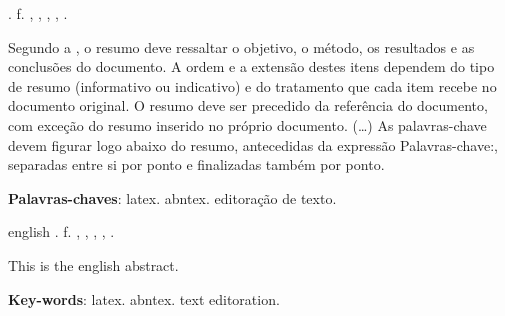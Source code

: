 
\begin{resumo}
\noindent 	\imprimircitaautores \MakeUppercase{ \imprimirtitulo.} \pageref{LastPage} f. \imprimirtipotrabalho, \imprimirprograma, \imprimirinstituicao, \imprimirlocal, \imprimirdata.
\vspace{\onelineskip}

\noindent	Segundo a , o resumo deve ressaltar o
	objetivo, o método, os resultados e as conclusões do documento. A ordem e a extensão
	destes itens dependem do tipo de resumo (informativo ou indicativo) e do
	tratamento que cada item recebe no documento original. O resumo deve ser
	precedido da referência do documento, com exceção do resumo inserido no
	próprio documento. (\ldots) As palavras-chave devem figurar logo abaixo do
	resumo, antecedidas da expressão Palavras-chave:, separadas entre si por
	ponto e finalizadas também por ponto.
	
\vspace{\onelineskip}	
\noindent \textbf{Palavras-chaves}: latex. abntex. editoração de texto.
\end{resumo}




\begin{resumo}[Abstract]
	\begin{otherlanguage*}{english}
		\noindent 	\imprimircitaautores \MakeUppercase{ \imprimirtituloEng.} \pageref{LastPage} f. \imprimirtipotrabalhoEng, \imprimirprogramaEng, \imprimirinstituicaoEng, \imprimirlocal, \imprimirdata.
		\vspace{\onelineskip}
		
		\noindent	This is the english abstract.
		
		\vspace{\onelineskip}		
		\noindent\textbf{Key-words}: latex. abntex. text editoration.
	\end{otherlanguage*}
\end{resumo}





%
%
%		
%
%
%		


